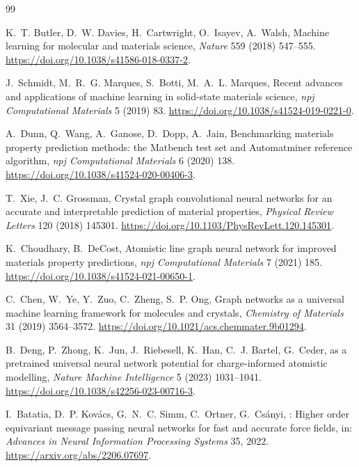 \documentclass[final,5p,twocolumn,10pt]{elsarticle}
\begin{document}

\begin{thebibliography}{99}

K.~T. Butler, D.~W. Davies, H.~Cartwright, O.~Isayev, A.~Walsh,
\newblock Machine learning for molecular and materials science,
\newblock \textit{Nature} 559 (2018) 547--555.
\newblock \url{https://doi.org/10.1038/s41586-018-0337-2}.

J.~Schmidt, M.~R.~G. Marques, S.~Botti, M.~A.~L. Marques,
\newblock Recent advances and applications of machine learning in solid-state materials science,
\newblock \textit{npj Computational Materials} 5 (2019) 83.
\newblock \url{https://doi.org/10.1038/s41524-019-0221-0}.

A.~Dunn, Q.~Wang, A.~Ganose, D.~Dopp, A.~Jain,
\newblock Benchmarking materials property prediction methods: the Matbench test set and Automatminer reference algorithm,
\newblock \textit{npj Computational Materials} 6 (2020) 138.
\newblock \url{https://doi.org/10.1038/s41524-020-00406-3}.

T.~Xie, J.~C. Grossman,
\newblock Crystal graph convolutional neural networks for an accurate and interpretable prediction of material properties,
\newblock \textit{Physical Review Letters} 120 (2018) 145301.
\newblock \url{https://doi.org/10.1103/PhysRevLett.120.145301}.

K.~Choudhary, B.~DeCost,
\newblock Atomistic line graph neural network for improved materials property predictions,
\newblock \textit{npj Computational Materials} 7 (2021) 185.
\newblock \url{https://doi.org/10.1038/s41524-021-00650-1}.

C.~Chen, W.~Ye, Y.~Zuo, C.~Zheng, S.~P. Ong,
\newblock Graph networks as a universal machine learning framework for molecules and crystals,
\newblock \textit{Chemistry of Materials} 31 (2019) 3564--3572.
\newblock \url{https://doi.org/10.1021/acs.chemmater.9b01294}.

B.~Deng, P.~Zhong, K.~Jun, J.~Riebesell, K.~Han, C.~J. Bartel, G.~Ceder,
 as a pretrained universal neural network potential for charge-informed atomistic modelling,
\newblock \textit{Nature Machine Intelligence} 5 (2023) 1031--1041.
\newblock \url{https://doi.org/10.1038/s42256-023-00716-3}.

I.~Batatia, D.~P. Kov\'{a}cs, G.~N.~C. Simm, C.~Ortner, G.~Cs\'{a}nyi,
: Higher order equivariant message passing neural networks for fast and accurate force fields,
\newblock in: \textit{Advances in Neural Information Processing Systems} 35, 2022.
\newblock \url{https://arxiv.org/abs/2206.07697}.


\end{thebibliography}
\end{document}

